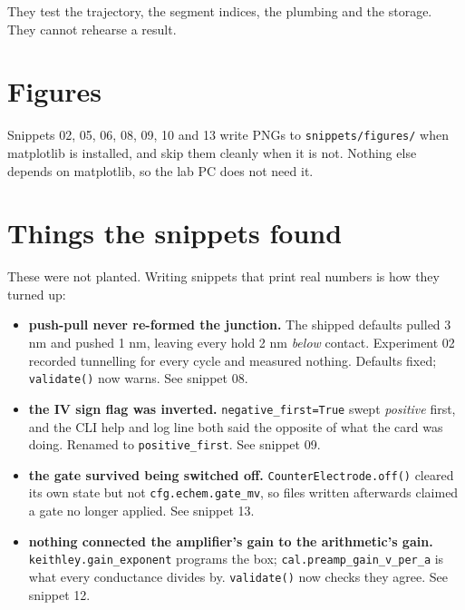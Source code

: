 They test the trajectory, the segment indices, the plumbing and the storage. They cannot rehearse a result.

\section{Figures}

Snippets 02, 05, 06, 08, 09, 10 and 13 write PNGs to \texttt{snippets/\discretionary{}{}{}figures/\discretionary{}{}{}} when matplotlib is installed, and skip them cleanly when it is not. Nothing else depends on matplotlib, so the lab PC does not need it.

\section{Things the snippets found}

These were not planted. Writing snippets that print real numbers is how they turned up:

\begin{itemize}[leftmargin=*]
\item \textbf{push-pull never re-formed the junction.} The shipped defaults pulled 3 nm and pushed 1 nm, leaving every hold 2 nm \emph{below} contact. Experiment 02 recorded tunnelling for every cycle and measured nothing. Defaults fixed; \texttt{validate()} now warns. See snippet 08.
\item \textbf{the IV sign flag was inverted.} \texttt{negative\_\discretionary{}{}{}first=True} swept \emph{positive} first, and the CLI help and log line both said the opposite of what the card was doing. Renamed to \texttt{positive\_\discretionary{}{}{}first}. See snippet 09.
\item \textbf{the gate survived being switched off.} \texttt{Counter\discretionary{}{}{}Electrode.\discretionary{}{}{}off()} cleared its own state but not \texttt{cfg.\discretionary{}{}{}echem.\discretionary{}{}{}gate\_\discretionary{}{}{}mv}, so files written afterwards claimed a gate no longer applied. See snippet 13.
\item \textbf{nothing connected the amplifier's gain to the arithmetic's gain.} \texttt{keithley.\discretionary{}{}{}gain\_\discretionary{}{}{}exponent} programs the box; \texttt{cal.\discretionary{}{}{}preamp\_\discretionary{}{}{}gain\_\discretionary{}{}{}v\_\discretionary{}{}{}per\_\discretionary{}{}{}a} is what every conductance divides by. \texttt{validate()} now checks they agree. See snippet 12.
\end{itemize}

